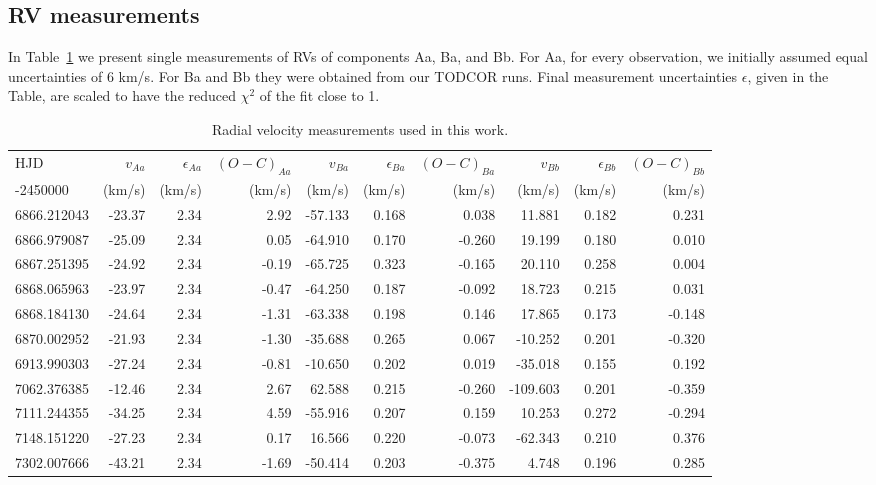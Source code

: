 \documentclass{aa}
\begin{document}
\begin{appendix} %
\section{RV measurements}

In Table~\ref{aptab_rv} we present single measurements of RVs of components Aa, Ba, and Bb.
For Aa, for every observation, we initially assumed equal uncertainties of 6 km/s. For Ba and Bb
they were obtained from our TODCOR runs. Final measurement uncertainties $\epsilon$, given in 
the Table, are scaled to have the reduced $\chi^2$ of the fit close to 1.

\begin{table}
\centering
\caption{Radial velocity measurements used in this work.\label{aptab_rv}}
\begin{tabular}{lrrrrrrrrr}
\hline \hline
HJD & $v_{Aa}$ & $\epsilon_{Aa}$ & $(O-C)_{Aa}$ & $v_{Ba}$ & $\epsilon_{Ba}$ & $(O-C)_{Ba}$ & $v_{Bb}$ & $\epsilon_{Bb}$ & $(O-C)_{Bb}$ \\
-2450000 & (km/s) & (km/s) & (km/s) & (km/s) & (km/s) & (km/s) & (km/s) & (km/s) & (km/s) \\
\hline
6866.212043 & -23.37 & 2.34 &  2.92 & -57.133 & 0.168 &  0.038 &   11.881 & 0.182 &  0.231 \\
6866.979087 & -25.09 & 2.34 &  0.05 & -64.910 & 0.170 & -0.260 &   19.199 & 0.180 &  0.010 \\
6867.251395 & -24.92 & 2.34 & -0.19 & -65.725 & 0.323 & -0.165 &   20.110 & 0.258 &  0.004 \\
6868.065963 & -23.97 & 2.34 & -0.47 & -64.250 & 0.187 & -0.092 &   18.723 & 0.215 &  0.031 \\
6868.184130 & -24.64 & 2.34 & -1.31 & -63.338 & 0.198 &  0.146 &   17.865 & 0.173 & -0.148 \\
6870.002952 & -21.93 & 2.34 & -1.30 & -35.688 & 0.265 &  0.067 &  -10.252 & 0.201 & -0.320 \\
6913.990303 & -27.24 & 2.34 & -0.81 & -10.650 & 0.202 &  0.019 &  -35.018 & 0.155 &  0.192 \\
7062.376385 & -12.46 & 2.34 &  2.67 &  62.588 & 0.215 & -0.260 & -109.603 & 0.201 & -0.359 \\
7111.244355 & -34.25 & 2.34 &  4.59 & -55.916 & 0.207 &  0.159 &   10.253 & 0.272 & -0.294 \\
7148.151220 & -27.23 & 2.34 &  0.17 &  16.566 & 0.220 & -0.073 &  -62.343 & 0.210 &  0.376 \\
7302.007666 & -43.21 & 2.34 & -1.69 & -50.414 & 0.203 & -0.375 &    4.748 & 0.196 &  0.285 \\

\end{tabular}
\end{table}
\end{appendix}
\end{document}

